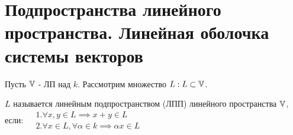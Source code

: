 \documentclass[../main.tex]{subfiles}
\begin{document}
\section{Подпространства линейного пространства. Линейная оболочка системы векторов}
Пусть $\mathbb{V}$ - ЛП над $k$. Рассмотрим множество $L: L\subset\mathbb{V}$. 
\begin{definition}
    $L$ называется линейным подпространством (ЛПП) линейного пространства $\mathbb{V}$, \\если: $\begin{aligned}
        &1. \forall x,y \in L \implies x+y \in L\\
        &2. \forall x\in L, \forall \alpha \in k \implies \alpha x \in L
    \end{aligned}$
\end{definition}
\end{document}
